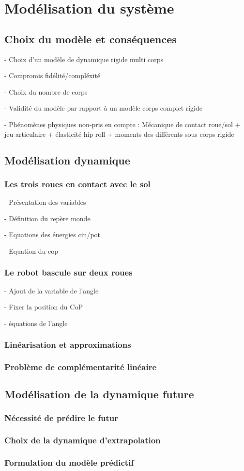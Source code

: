 \chapter{Modélisation du système}
\section{Choix du modèle et conséquences}
	
	- Choix d'un modèle de dynamique rigide multi corps
	
	- Compromis fidélité/compléxité
	
	- Choix du nombre de corps
	
	- Validité du modèle par rapport à un modèle corps complet rigide
	
	- Phénomènes physiques non-pris en compte : Mécanique de contact roue/sol + jeu articulaire + élasticité hip roll + moments des différents sous corps rigide
	
	\section{Modélisation dynamique}
		\subsection{Les trois roues en contact avec le sol}
		
		- Présentation des variables
		
		- Définition du repère monde
		
		- Equations des énergies cin/pot
		
		- Equation du cop
		
		\subsection{Le robot bascule sur deux roues}
		
		- Ajout de la variable de l'angle
		
		- Fixer la position du CoP
		
		- équations de l'angle
		
		\subsection{Linéarisation et approximations}
		\subsection{Problème de complémentarité linéaire}
	\section{Modélisation de la dynamique future}
		\subsection{Nécessité de prédire le futur}
		\subsection{Choix de la dynamique d'extrapolation}
		\subsection{Formulation du modèle prédictif}
